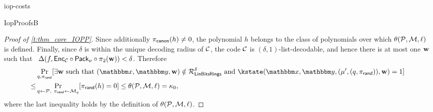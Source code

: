 \begin{lncsappendix}{iop-costs}
\begin{lncsmove}{IopProofsB}
\begin{proof}[Proof of \cref{t:thm_core_IOPP}]
Since additionally $\pi_{\mathsf{canon}}(h)\neq 0$, the polynomial $h$ belongs to the class of polynomials over which $\theta(\mathcal{P},\mathcal{M},\ell)$ is defined. Finally,  since $\delta$ is within the unique decoding radius of $\mathcal{C}$, the code $\mathcal{C}$ is $(\delta,1)$-list-decodable, and hence there is at most one $\mathbf{w}$ such that \ $\Delta(f,\mathsf{Enc}_{\mathcal{C}}\circ\mathsf{Pack}_\nu\circ \pi_2(\mathbf{w}))< \delta$.  Therefore  $$
\begin{aligned}
&\Pr_{q,\pirand}[\exists \ww  \text{ such that } (\inp,\oracle,\ww)\notin \LinBitsDual^\delta \text{ and } \kstate(\inp,\lncsbreak\oracle,\lncsbreak(\mu', (q,\pirand)), \ww)=1]\\ \leq &\Pr_{q\gets \cP,\ \pirand\gets \cM_q}[\pirand(h)=0] \leq \theta(\cP,\cM,\codedim) = \kappa_0,
\end{aligned}
$$
%
where the last inequality holds by the definition of $\theta(\mathcal{P},\mathcal{M},\ell)$.

\bigskip


\end{proof}
\end{lncsmove}
\end{lncsappendix}
